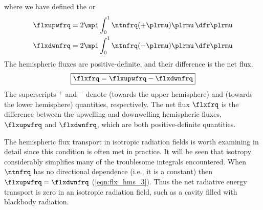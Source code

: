 \documentclass[12pt]{article}
\begin{document}
where we have defined the  or
\begin{subequations}
\label{eqn:flx_hms}
\begin{align}
\label{eqn:flx_upw_frq}
\flxupwfrq & = 2 \mpi \int_{0}^{1} \ntnfrq (+\plrmu) \plrmu \,
\dfr\plrmu \\
\label{eqn:flx_dwn_frq}
\flxdwnfrq & = 2 \mpi \int_{0}^{1} \ntnfrq (-\plrmu) \plrmu \,
\dfr\plrmu
\end{align}
\end{subequations} 
The hemispheric fluxes are positive-definite, and their difference is
the net flux.
\setlength{\fboxsep}{6pt} %
\newline\fbox{\parbox{\hsize}{  %
\begin{equation}
\flxfrq = \flxupwfrq - \flxdwnfrq
\label{eqn:flx_hms_2}
\end{equation} 
}} %
\begin{equation} 
\fbox{$ \displaystyle %
\flxfrq = \flxupwfrq - \flxdwnfrq $} %
\label{eqn:flx_hms_3}
\end{equation} 
The superscripts $^+$ and $^-$ denote 
(towards the upper hemisphere) and  (towards the
lower hemisphere) quantities, respectively.
The net flux $\flxfrq$ is the difference between the upwelling and
downwelling hemispheric fluxes, $\flxupwfrq$ and $\flxdwnfrq$, which
are both positive-definite quantities.

The hemispheric flux transport in isotropic radiation fields
is worth examining in detail since this condition is often met
in practice.
It will be seen that isotropy considerably simplifies many of the 
troublesome integrals encountered.
When $\ntnfrq$ has no directional dependence (i.e., it is a constant) 
then $\flxupwfrq = \flxdwnfrq$ (\ref{eqn:flx_hms_3}).
Thus the net radiative energy transport is zero in an isotropic
radiation field, such as a cavity filled with blackbody radiation. 
\end{document}
